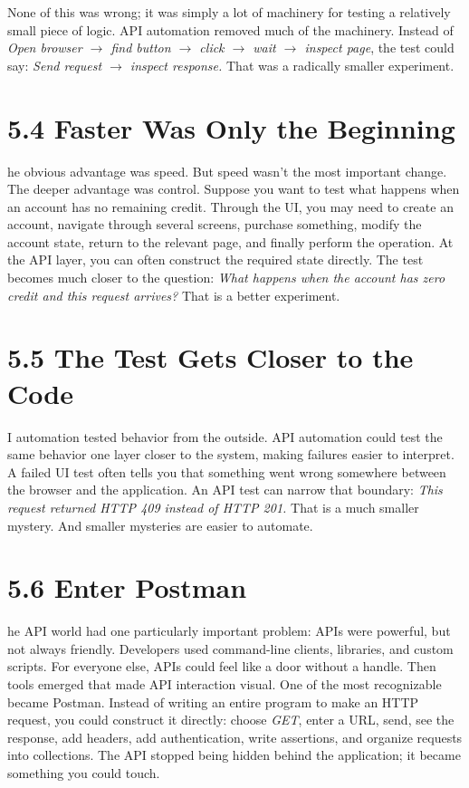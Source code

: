 \documentclass[11pt, a4paper, openany]{book}
\newcommand{\initialcap}[1]{{\fontfamily{lmss}\selectfont\huge\textbf{#1}}}
\begin{document}
\noindent None of this was wrong; it was simply a lot of machinery for testing a relatively small piece of logic. API automation removed much of the machinery. Instead of \textit{Open browser $\rightarrow$ find button $\rightarrow$ click $\rightarrow$ wait $\rightarrow$ inspect page}, the test could say: \textit{Send request $\rightarrow$ inspect response.} That was a radically smaller experiment.

\section{5.4 Faster Was Only the Beginning}
\noindent \initialcap{T}he obvious advantage was speed. But speed wasn't the most important change. The deeper advantage was control. Suppose you want to test what happens when an account has no remaining credit. Through the UI, you may need to create an account, navigate through several screens, purchase something, modify the account state, return to the relevant page, and finally perform the operation. At the API layer, you can often construct the required state directly. The test becomes much closer to the question: \textit{What happens when the account has zero credit and this request arrives?} That is a better experiment.

\section{5.5 The Test Gets Closer to the Code}
\noindent \initialcap{U}I automation tested behavior from the outside. API automation could test the same behavior one layer closer to the system, making failures easier to interpret. A failed UI test often tells you that something went wrong somewhere between the browser and the application. An API test can narrow that boundary: \textit{This request returned HTTP 409 instead of HTTP 201.} That is a much smaller mystery. And smaller mysteries are easier to automate.

\section{5.6 Enter Postman}
\noindent \initialcap{T}he API world had one particularly important problem: APIs were powerful, but not always friendly. Developers used command-line clients, libraries, and custom scripts. For everyone else, APIs could feel like a door without a handle. Then tools emerged that made API interaction visual. One of the most recognizable became Postman. Instead of writing an entire program to make an HTTP request, you could construct it directly: choose \textit{GET}, enter a URL, send, see the response, add headers, add authentication, write assertions, and organize requests into collections. The API stopped being hidden behind the application; it became something you could touch.
\end{document}
